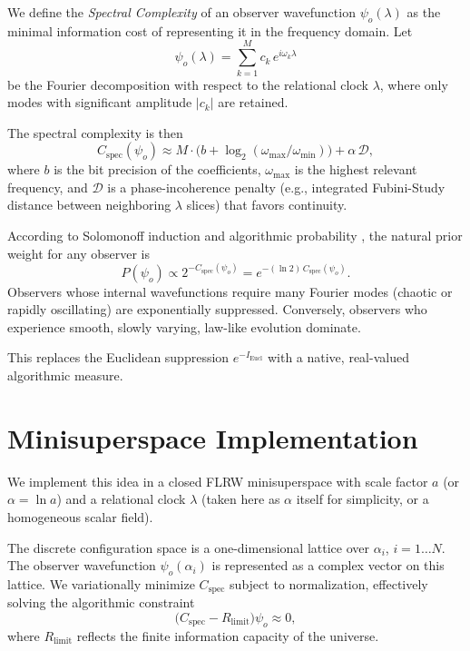 \documentclass[11pt]{article}
\begin{document}
We define the \textit{Spectral Complexity} of an observer wavefunction \(\psi_o(\lambda)\) as the minimal information cost of representing it in the frequency domain.
Let
\begin{equation}
\psi_o(\lambda) = \sum_{k=1}^{M} c_k \, e^{i \omega_k \lambda}
\end{equation}
be the Fourier decomposition with respect to the relational clock \(\lambda\), where only modes with significant amplitude \(|c_k|\) are retained.

The spectral complexity is then
\begin{equation}
C_{\text{spec}}(\psi_o) \approx M \cdot \bigl( b + \log_2(\omega_{\max}/\omega_{\min}) \bigr) + \alpha \, \mathcal{D},
\end{equation}
where \(b\) is the bit precision of the coefficients, \(\omega_{\max}\) is the highest relevant frequency, and \(\mathcal{D}\) is a phase-incoherence penalty (e.g., integrated Fubini-Study distance between neighboring \(\lambda\) slices) that favors continuity.

According to Solomonoff induction and algorithmic probability \cite{solomonoff1964}, the natural prior weight for any observer is
\begin{equation}
P(\psi_o) \propto 2^{-C_{\text{spec}}(\psi_o)} = e^{-(\ln 2) \, C_{\text{spec}}(\psi_o)}.
\end{equation}
Observers whose internal wavefunctions require many Fourier modes (chaotic or rapidly oscillating) are exponentially suppressed.
Conversely, observers who experience smooth, slowly varying, law-like evolution dominate.

This replaces the Euclidean suppression \(e^{-I_{\text{Eucl}}}\) with a native, real-valued algorithmic measure.

\section{Minisuperspace Implementation}

We implement this idea in a closed FLRW minisuperspace with scale factor \(a\) (or \(\alpha = \ln a\)) and a relational clock \(\lambda\) (taken here as \(\alpha\) itself for simplicity, or a homogeneous scalar field).

The discrete configuration space is a one-dimensional lattice over \(\alpha_i\), \(i = 1 \dots N\).
The observer wavefunction \(\psi_o(\alpha_i)\) is represented as a complex vector on this lattice.
We variationally minimize \(C_{\text{spec}}\) subject to normalization, effectively solving the algorithmic constraint
\begin{equation}
\bigl( C_{\text{spec}} - R_{\text{limit}} \bigr) \psi_o \approx 0,
\end{equation}
where \(R_{\text{limit}}\) reflects the finite information capacity of the universe.
\end{document}
